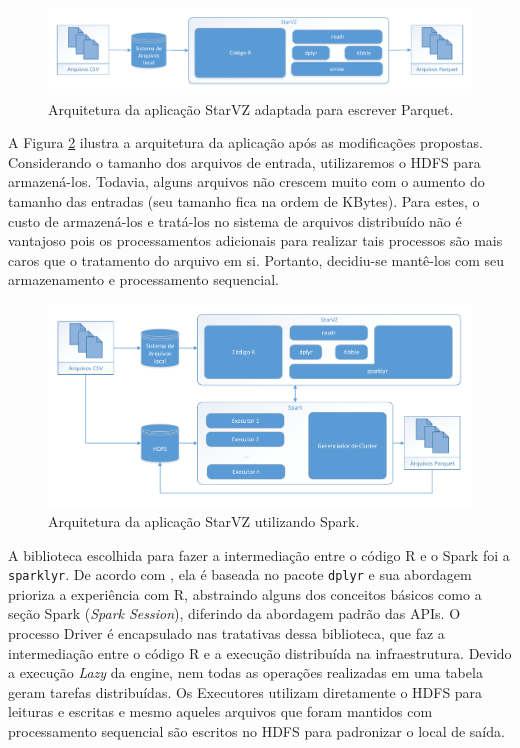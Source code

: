 \begin{figure}[ht]
 \centerline{\includegraphics[width=1\textwidth]{./img/starvz-arch-arrow.pdf}}
 \caption{Arquitetura da aplicação StarVZ adaptada para escrever Parquet.}
 \label{fig:starvz-app-arrow}
\end{figure}

A Figura \ref{fig:starvz-app-spark} ilustra a arquitetura da aplicação após as 
modificações propostas. Considerando o tamanho dos arquivos de entrada, 
utilizaremos o HDFS para armazená-los. Todavia, alguns arquivos não crescem 
muito com o aumento do tamanho das entradas (seu tamanho fica na ordem de 
KBytes). Para estes, o custo de armazená-los e tratá-los no 
sistema de arquivos distribuído não é vantajoso pois os processamentos 
adicionais para realizar tais processos são mais caros que o tratamento do 
arquivo em si. Portanto, decidiu-se mantê-los com seu armazenamento e 
processamento sequencial.

\begin{figure}[ht]
 \centerline{\includegraphics[width=1\textwidth]{./img/starvz-arch-spark.pdf}}
 \caption{Arquitetura da aplicação StarVZ utilizando Spark.}
 \label{fig:starvz-app-spark}
\end{figure}


A biblioteca escolhida para fazer a intermediação entre o código R e o Spark 
foi a \texttt{sparklyr}. De acordo com \citet{ref:sparkbook}, ela é 
baseada no pacote \texttt{dplyr} e sua abordagem prioriza a experiência com R, 
abstraindo alguns dos conceitos básicos como a seção Spark (\emph{Spark 
Session}), diferindo da abordagem padrão das APIs. O processo Driver é 
encapsulado nas tratativas dessa biblioteca, que faz a intermediação entre o 
código R e a execução distribuída na infraestrutura. Devido a execução 
\emph{Lazy} da engine, nem todas as operações realizadas em uma tabela geram 
tarefas distribuídas. Os Executores utilizam diretamente o HDFS para leituras e 
escritas e mesmo aqueles arquivos que foram mantidos com processamento 
sequencial são escritos no HDFS para padronizar o local de saída.


